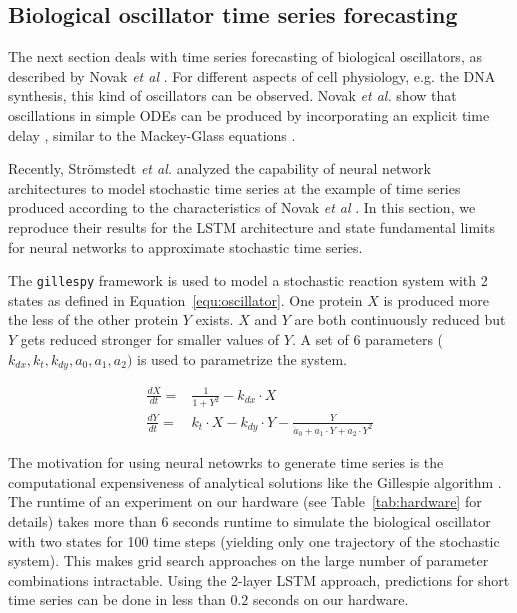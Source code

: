 \documentclass{article}
\begin{document}
\subsection{Biological oscillator time series forecasting}

The next section deals with time series forecasting of biological oscillators,
as described by Novak \textit{et al} \cite{novak2008}. For different aspects of
cell physiology, e.g. the DNA synthesis, this kind of oscillators can be
observed. Novak \textit{et al.} show that oscillations in simple ODEs can be
produced by incorporating an explicit time delay \cite{novak2008}, similar to
the Mackey-Glass equations \cite{mackey1977}.

Recently, Strömstedt \textit{et al.} analyzed the capability of neural network
architectures to model stochastic time series \cite{stroemstedt2018} at the
example of time series produced according to the characteristics of Novak
\textit{et al} \cite{novak2008}. In this section, we reproduce their results for
the LSTM architecture and state fundamental limits for neural networks to
approximate stochastic time series.

The \texttt{gillespy} framework is used to 
model a stochastic reaction system with 2 states as defined 
in Equation~\ref{equ:oscillator}.
One protein $X$ is produced more the less of the other protein $Y$
exists. $X$ and $Y$ are both continuously reduced but $Y$ gets reduced stronger
for smaller values of $Y$. A set of 6 parameters
($k_{dx}, k_t, k_{dy}, a_0, a_1, a_2)$
is used to parametrize the system.

\begin{align}
    \frac{dX}{dt} = & \frac{1}{1+Y^2} - k_{dx} \cdot X                                           \\
    \frac{dY}{dt} = & k_t \cdot X - k_{dy} \cdot Y - \frac{Y}{a_0 + a_1 \cdot Y + a_2 \cdot Y^2}
    \label{equ:oscillator}
\end{align}

The motivation for using neural netowrks to generate time series is the
computational expensiveness of analytical solutions like the Gillespie
algorithm \cite{gillespie1977}. The runtime of an experiment on our hardware
(see Table~\ref{tab:hardware} for details)
takes more than 6 seconds runtime to simulate the biological oscillator with two
states for 100 time steps (yielding only one trajectory of the stochastic
system). This makes grid search approaches on the large number
of parameter
combinations intractable. Using the 2-layer LSTM approach, predictions for
short time series can be done in less than $0.2$ seconds on our hardware.
\end{document}
